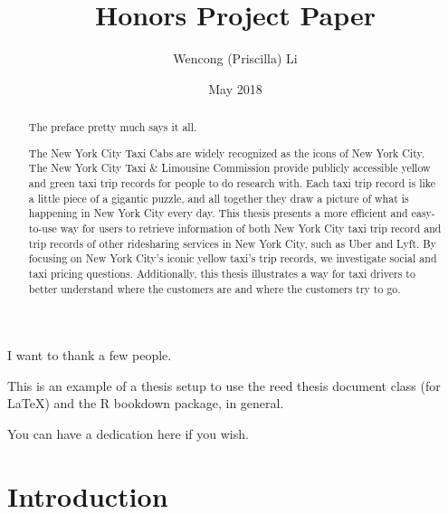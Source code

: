 \documentclass[12pt,twoside]{reedthesis}
\title{Honors Project Paper}
\author{Wencong (Priscilla) Li}
\date{May 2018}
\theoremstyle{definition}
\theoremstyle{definition}
\theoremstyle{definition}
\theoremstyle{remark}
\begin{document}
  \maketitle

\frontmatter %
\pagestyle{empty} %
  \begin{acknowledgements}
    I want to thank a few people.
  \end{acknowledgements}
  \begin{preface}
    This is an example of a thesis setup to use the reed thesis document
    class (for LaTeX) and the R bookdown package, in general.
  \end{preface}
  \hypersetup{linkcolor=black}
  \setcounter{tocdepth}{2}
  \tableofcontents

  \listoftables

  \listoffigures
  \begin{abstract}
    The preface pretty much says it all. \par
    
    The New York City Taxi Cabs are widely recognized as the icons of New
    York City. The New York City Taxi \& Limousine Commission provide
    publicly accessible yellow and green taxi trip records for people to do
    research with. Each taxi trip record is like a little piece of a
    gigantic puzzle, and all together they draw a picture of what is
    happening in New York City every day. This thesis presents a more
    efficient and easy-to-use way for users to retrieve information of both
    New York City taxi trip record and trip records of other ridesharing
    services in New York City, such as Uber and Lyft. By focusing on New
    York City's iconic yellow taxi's trip records, we investigate social and
    taxi pricing questions. Additionally, this thesis illustrates a way for
    taxi drivers to better understand where the customers are and where the
    customers try to go.
  \end{abstract}
  \begin{dedication}
    You can have a dedication here if you wish.
  \end{dedication}
\mainmatter %
\pagestyle{fancyplain} %

\chapter{Introduction}\label{introduction}
\end{document}
